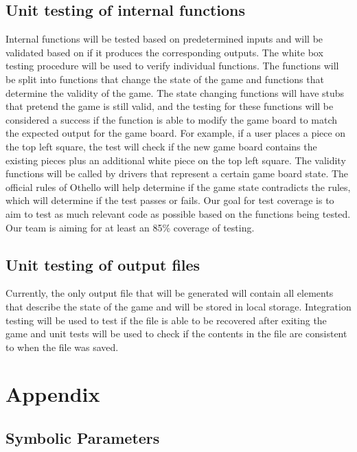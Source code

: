 \documentclass[12pt, titlepage]{article}
\begin{document}
\subsection{Unit testing of internal functions}
Internal functions will be tested based on predetermined inputs and will be validated based on if it produces the corresponding outputs. The white box testing procedure will be used to verify individual functions. The functions will be split into functions that change the state of the game and functions that determine the validity of the game. The state changing functions will have stubs that pretend the game is still valid, and the testing for these functions will be considered a success if the function is able to modify the game board to match the expected output for the game board. For example, if a user places a piece on the top left square, the test will check if the new game board contains the existing pieces plus an additional white piece on the top left square. The validity functions will be called by drivers that represent a certain game board state. The official rules of Othello will help determine if the game state contradicts the rules, which will determine if the test passes or fails. Our goal for test coverage is to aim to test as much relevant code as possible based on the functions being tested. Our team is aiming for at least an 85\% coverage of testing.

\subsection{Unit testing of output files}
{\color{blue}
Currently, the only output file that will be generated will contain all elements that describe the state of the game and will be stored in local storage. Integration testing will be used to test if the file is able to be recovered after exiting the game and unit tests will be used to check if the contents in the file are consistent to when the file was saved.}





\newpage

\section{Appendix}

\subsection{Symbolic Parameters}
\end{document}
